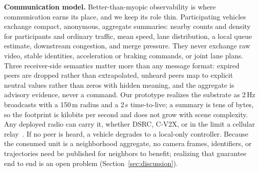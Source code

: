 \noindent\textbf{Communication model.}
Better-than-myopic observability is where communication earns its place, and we keep its role thin. Participating vehicles exchange compact, anonymous, aggregate summaries: nearby counts and density for participants and ordinary traffic, mean speed, lane distribution, a local queue estimate, downstream congestion, and merge pressure. They never exchange raw video, stable identities, acceleration or braking commands, or joint lane plans. Three receiver-side semantics matter more than any message format: expired peers are dropped rather than extrapolated, unheard peers map to explicit neutral values rather than zeros with hidden meaning, and the aggregate is advisory evidence, never a command. Our prototype realizes the substrate as 2\,Hz broadcasts with a 150\,m radius and a 2\,s time-to-live; a summary is tens of bytes, so the footprint is kilobits per second and does not grow with scene complexity. Any deployed radio can carry it, whether DSRC, C-V2X, or in the limit a cellular relay~\cite{sae2020j2735,etsi2019cam,kenney2011dedicated}. If no peer is heard, a vehicle degrades to a local-only controller. Because the consumed unit is a neighborhood aggregate, no camera frames, identifiers, or trajectories need be published for neighbors to benefit; realizing that guarantee end to end is an open problem (Section~\ref{sec:discussion}).

